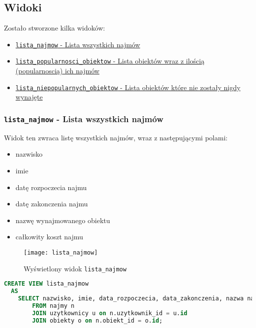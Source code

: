 \subsection{Widoki}

Zostało stworzone kilka widoków:
\begin{itemize}
	\item \href{run:Sources/SQL/2. Widoki/014_Utworzenie_widoku_z_lista_wszystkich_najmow.sql}{\texttt{lista\_najmow} - Lista wszystkich najmów}
	\item \href{run:Sources/SQL/2. Widoki/015_Utworzenie_widoku_z_lista_popularnosci_obiektow.sql}{\texttt{lista\_popularnosci\_obiektow} - Lista obiektów wraz z ilością (popularnoscią) ich najmów}
	\item \href{run:Sources/SQL/2. Widoki/016_Utworzenie_widoku_z_lista_niewynajmowanych_obiektow.sql}{\texttt{lista\_niepopularnych\_obiektow} - Lista obiektów które nie zostały nigdy wynajęte}
\end{itemize}

\subsubsection{\texttt{lista\_najmow} - Lista wszystkich najmów}

Widok ten zwraca listę wszystkich najmów, wraz z następującymi polami:
\begin{itemize}
	\item nazwisko
	\item imie
	\item datę rozpoczecia najmu
	\item datę zakonczenia najmu
	\item nazwę wynajmowanego obiektu
	\item całkowity koszt najmu
\end{itemize}

\begin{figure}[h]
	\centering
    \texttt{[image: lista\_najmow]}
	\caption{Wyświetlony widok \texttt{lista\_najmow}}
	\label{fig:lista_najmow}
\end{figure}

\begin{lstlisting}[language=SQL, caption={Skrypt tworzący widok \texttt{lista\_najmow}}, label={lst:view-lista_najmow}]
CREATE VIEW lista_najmow
  AS
    SELECT nazwisko, imie, data_rozpoczecia, data_zakonczenia, nazwa nazwa_obiektu, koszt calkowity_koszt
        FROM najmy n
        JOIN uzytkownicy u on n.uzytkownik_id = u.id
        JOIN obiekty o on n.obiekt_id = o.id;
\end{lstlisting}



